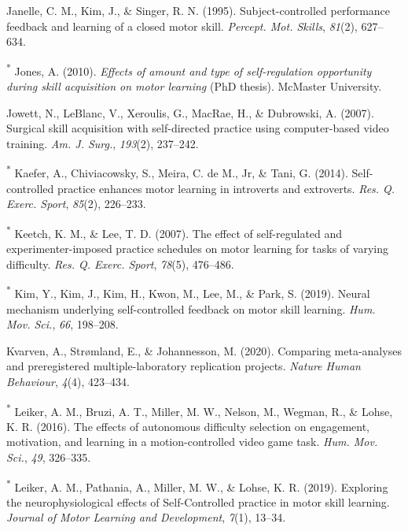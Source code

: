 \documentclass[
  english,
  man, donotrepeattitle,floatsintext]{apa7}
\newlength{\cslhangindent}
\newlength{\cslentryspacingunit} %
\newenvironment{CSLReferences}[2] %
 {%
  \setlength{\parindent}{0pt}
  \ifodd #1
  \let\oldpar\par
  \def\par{\hangindent=\cslhangindent\oldpar}
  \fi
  \setlength{\parskip}{#2\cslentryspacingunit}
 }%
 {}
\begin{document}
\begin{CSLReferences}{1}{0}
\leavevmode{}%
Janelle, C. M., Kim, J., \& Singer, R. N. (1995). Subject-controlled performance feedback and learning of a closed motor skill. \emph{Percept. Mot. Skills}, \emph{81}(2), 627--634.

\leavevmode{}%
\textsuperscript{*} Jones, A. (2010). \emph{Effects of amount and type of self-regulation opportunity during skill acquisition on motor learning} (PhD thesis). McMaster University.

\leavevmode{}%
Jowett, N., LeBlanc, V., Xeroulis, G., MacRae, H., \& Dubrowski, A. (2007). Surgical skill acquisition with self-directed practice using computer-based video training. \emph{Am. J. Surg.}, \emph{193}(2), 237--242.

\leavevmode{}%
\textsuperscript{*} Kaefer, A., Chiviacowsky, S., Meira, C. de M., Jr, \& Tani, G. (2014). Self-controlled practice enhances motor learning in introverts and extroverts. \emph{Res. Q. Exerc. Sport}, \emph{85}(2), 226--233.

\leavevmode{}%
\textsuperscript{*} Keetch, K. M., \& Lee, T. D. (2007). The effect of self-regulated and experimenter-imposed practice schedules on motor learning for tasks of varying difficulty. \emph{Res. Q. Exerc. Sport}, \emph{78}(5), 476--486.

\leavevmode{}%
\textsuperscript{*} Kim, Y., Kim, J., Kim, H., Kwon, M., Lee, M., \& Park, S. (2019). Neural mechanism underlying self-controlled feedback on motor skill learning. \emph{Hum. Mov. Sci.}, \emph{66}, 198--208.

\leavevmode{}%
Kvarven, A., Strømland, E., \& Johannesson, M. (2020). Comparing meta-analyses and preregistered multiple-laboratory replication projects. \emph{Nature Human Behaviour}, \emph{4}(4), 423--434.

\leavevmode{}%
\textsuperscript{*} Leiker, A. M., Bruzi, A. T., Miller, M. W., Nelson, M., Wegman, R., \& Lohse, K. R. (2016). The effects of autonomous difficulty selection on engagement, motivation, and learning in a motion-controlled video game task. \emph{Hum. Mov. Sci.}, \emph{49}, 326--335.

\leavevmode{}%
\textsuperscript{*} Leiker, A. M., Pathania, A., Miller, M. W., \& Lohse, K. R. (2019). Exploring the neurophysiological effects of {Self-Controlled} practice in motor skill learning. \emph{Journal of Motor Learning and Development}, \emph{7}(1), 13--34.


\end{CSLReferences}
\end{document}
